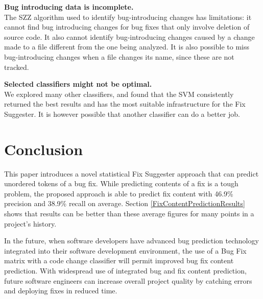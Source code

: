 \documentclass[preprint,10pt]{sigplanconf}
\begin{document}
\par \textbf{Bug introducing data is incomplete.} \\ The SZZ algorithm used to identify bug-introducing
changes has limitations: it cannot find bug introducing changes for bug fixes that only involve deletion of source code.
It also cannot identify bug-introducing changes caused by a change made to a file different from the one being analyzed. It is also possible to miss bug-introducing changes when a file changes its name, since these are not tracked.

\par \textbf{Selected classifiers might not be optimal.} \\ We explored many
other classifiers, and found that the SVM consistently returned the
best results and has the most suitable infrastructure for the Fix Suggester. It is however possible that another classifier can do a better job.

\section{Conclusion}
\par This paper introduces a novel statistical Fix Suggester approach that can predict unordered tokens of a bug fix. While predicting contents of a fix is a tough problem, the proposed approach is able to predict fix content with 46.9\% precision and 38.9\% recall on average. Section \ref{FixContentPredictionResults} shows that results can be better than these average figures for many points in a project's history.

\par In the future, when software developers have advanced bug prediction technology
integrated into their software development environment, the use of a Bug Fix matrix with a code change classifier will permit improved bug fix content prediction. With
widespread use of integrated bug and fix content prediction, future software engineers can
increase overall project quality by catching errors and deploying fixes in reduced time.





 
\end{document}
